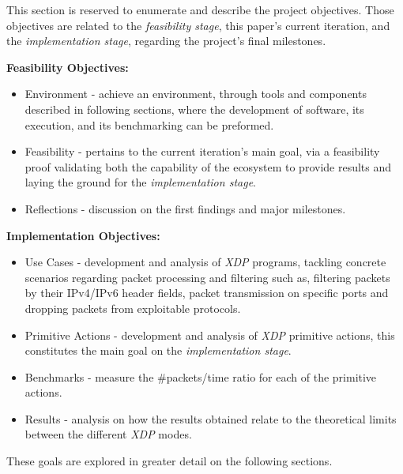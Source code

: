 This section is reserved to enumerate and describe the project objectives.
Those objectives are related to the \textit{feasibility stage}, this paper's current iteration, and the \textit{implementation stage}, regarding the project's final milestones. 

\textbf{Feasibility Objectives:}
\begin{itemize}
    \item Environment - achieve an environment, through tools and components described in following sections, where the development of software, its execution, and its benchmarking can be preformed.
    \item Feasibility - pertains to the current iteration's main goal, via a feasibility proof validating both the capability of the ecosystem to provide results and laying the ground for the \textit{implementation stage}.
    \item Reflections - discussion on the first findings and major milestones.
\end{itemize}

\textbf{Implementation Objectives:}
\begin{itemize}
    \item Use Cases - development and analysis of \textit{XDP} programs, tackling concrete scenarios  regarding packet processing and filtering such as, filtering packets by their IPv4/IPv6 header fields, packet transmission on specific ports and dropping packets from exploitable protocols.
    \item Primitive Actions - development and analysis of \textit{XDP} primitive actions, this constitutes the main goal on the \textit{implementation stage}.
    \item Benchmarks - measure the \#packets/time ratio for each of the primitive actions.
    \item Results - analysis on how the results obtained relate to the theoretical limits between the different \textit{XDP} modes. 
\end{itemize}

These goals are explored in greater detail on the following sections.


